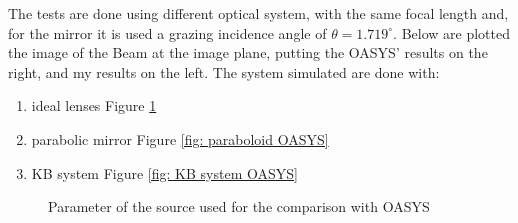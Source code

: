 %
The tests are done using different optical system, with the same focal length and, for the mirror it is used a grazing incidence angle of $\theta = 1.719^{\circ}$. Below are plotted the image of the Beam at the image plane, putting the OASYS' results on the right, and my results on the left. The system simulated are done with:
\begin{enumerate}
\item ideal lenses Figure \ref{fig: Ideal lense OASYS}
\item parabolic mirror Figure \ref{fig: paraboloid OASYS}
\item KB system Figure \ref{fig: KB system OASYS}
\end{enumerate} 
%
\begin{figure}[]
%
\centering
%
%
%
\caption{Parameter of the source used for the comparison with OASYS}
%
\label{fig: Ideal lense OASYS}
%
\end{figure}
%
